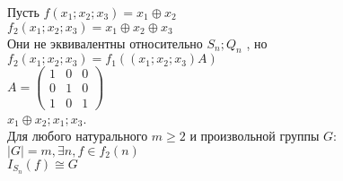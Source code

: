 \example 
Пусть $f(x_1;x_2;x_3)=x_1\oplus x_2$\\
$f_2(x_1;x_2;x_3)=x_1 \oplus x_2 \oplus x_3$ \\
Они не эквивалентны относительно $S_n;Q_n$ , но
$f_2(x_1;x_2;x_3)=f_1((x_1;x_2;x_3)A)$\\



$A=
\begin{pmatrix}
  1 & 0 & 0\\
  0 & 1 & 0\\
  1 & 0 & 1
  
  
\end{pmatrix}$\\

$x_1 \oplus x_2;x_1;x_3$.\\


\thr
Для любого натурального $ m \geqslant 2$ и произвольной группы $G$:
$|G|=m , \exists n ,f\in f_2(n)$\\
$I_{S_n}(f) \cong G$

 







